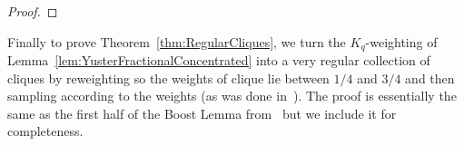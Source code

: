 \documentclass[11pt]{article}
\numberwithin{equation}{section}
\newcounter{i}
\theoremstyle{plain}
\theoremstyle{plain} %
\theoremstyle{definition}
\newcommand{\cF}{\mathcal{F}}
\begin{document}
\begin{proof}

\end{proof}

Finally to prove Theorem~\ref{thm:RegularCliques}, we turn the $K_q$-weighting of Lemma~\ref{lem:YusterFractionalConcentrated} into a very regular collection of cliques by reweighting so the weights of clique lie between $1/4$ and $3/4$ and then sampling according to the weights (as was done in~\cite{GKLO16}). The proof is essentially the same as the first half of the Boost Lemma from~\cite{GKLO16} but we include it for completeness.
\end{document}
